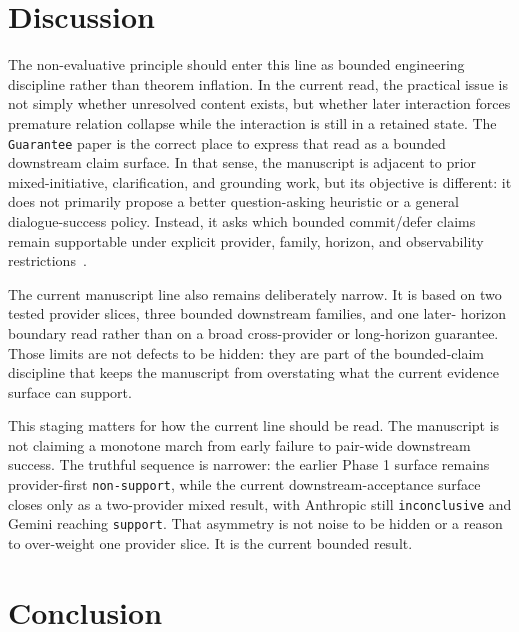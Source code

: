 \documentclass[11pt]{article}
\begin{document}
\section{Discussion}

The non-evaluative principle should enter this line as bounded engineering
discipline rather than theorem inflation. In the current read, the practical issue
is not simply whether unresolved content exists, but whether later interaction
forces premature relation collapse while the interaction is still in a retained
state. The \texttt{Guarantee} paper is the correct place to express that read as
a bounded downstream claim surface. In that sense, the manuscript is adjacent to
prior mixed-initiative, clarification, and grounding work, but its objective is
different: it does not primarily propose a better question-asking heuristic or a
general dialogue-success policy. Instead, it asks which bounded commit/defer
claims remain supportable under explicit provider, family, horizon, and
observability restrictions~\cite{chucarroll2000mimic,deboni2003clarification,rao2018evpi,benotti2021grounding}.

The current manuscript line also remains deliberately narrow. It is based on
two tested provider slices, three bounded downstream families, and one later-
horizon boundary read rather than on a broad cross-provider or long-horizon
guarantee. Those limits are not defects to be hidden: they are part of the
bounded-claim discipline that keeps the manuscript from overstating what the
current evidence surface can support.

This staging matters for how the current line should be read. The manuscript is
not claiming a monotone march from early failure to pair-wide downstream
success. The truthful sequence is narrower: the earlier Phase 1 surface remains
provider-first \texttt{non-support}, while the current downstream-acceptance
surface closes only as a two-provider mixed result, with Anthropic still
\texttt{inconclusive} and Gemini reaching \texttt{support}. That asymmetry is
not noise to be hidden or a reason to over-weight one provider slice. It is the
current bounded result.

\section{Conclusion}
\end{document}

